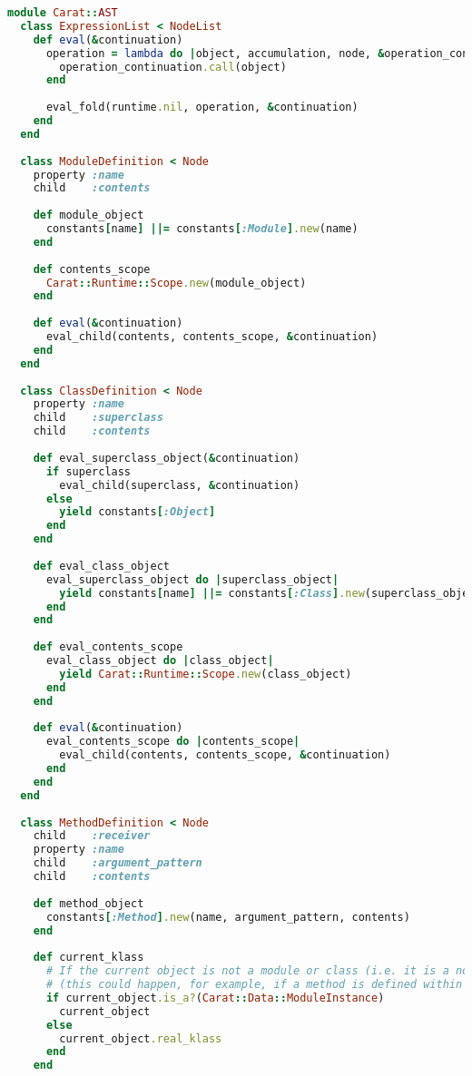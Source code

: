 \begin{lstlisting}[title={\small\ttfamily\bfseries ast/scopes.rb},language=Ruby]
module Carat::AST
  class ExpressionList < NodeList
    def eval(&continuation)
      operation = lambda do |object, accumulation, node, &operation_continuation|
        operation_continuation.call(object)
      end
      
      eval_fold(runtime.nil, operation, &continuation)
    end
  end
  
  class ModuleDefinition < Node
    property :name
    child    :contents
    
    def module_object
      constants[name] ||= constants[:Module].new(name)
    end
    
    def contents_scope
      Carat::Runtime::Scope.new(module_object)
    end
    
    def eval(&continuation)
      eval_child(contents, contents_scope, &continuation)
    end
  end
  
  class ClassDefinition < Node
    property :name
    child    :superclass
    child    :contents
    
    def eval_superclass_object(&continuation)
      if superclass
        eval_child(superclass, &continuation)
      else
        yield constants[:Object]
      end
    end
    
    def eval_class_object
      eval_superclass_object do |superclass_object|
        yield constants[name] ||= constants[:Class].new(superclass_object, name)
      end
    end
    
    def eval_contents_scope
      eval_class_object do |class_object|
        yield Carat::Runtime::Scope.new(class_object)
      end
    end
    
    def eval(&continuation)
      eval_contents_scope do |contents_scope|
        eval_child(contents, contents_scope, &continuation)
      end
    end
  end
  
  class MethodDefinition < Node
    child    :receiver
    property :name
    child    :argument_pattern
    child    :contents
    
    def method_object
      constants[:Method].new(name, argument_pattern, contents)
    end
    
    def current_klass
      # If the current object is not a module or class (i.e. it is a normal object), get its class
      # (this could happen, for example, if a method is defined within another method)
      if current_object.is_a?(Carat::Data::ModuleInstance)
        current_object
      else
        current_object.real_klass
      end
    end
    

\end{lstlisting}
